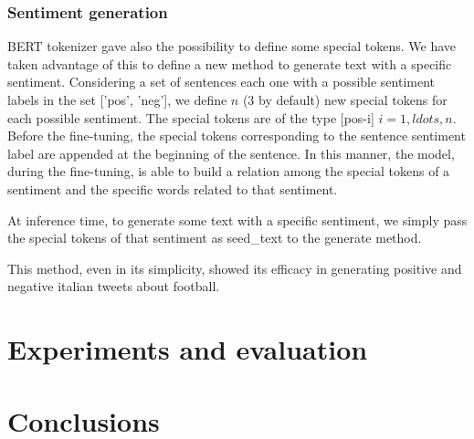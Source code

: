 \documentclass[10pt,twocolumn,letterpaper]{article}
\begin{document}
\subsubsection{Sentiment generation}
BERT tokenizer gave also the possibility to define some special tokens.
We have taken advantage of this to define a new method to generate text
with a specific sentiment.
Considering a set of sentences each one with a possible sentiment labels
in the set ['pos', 'neg'], we define $n$ (3 by default) new special tokens
for each possible sentiment.
The special tokens are of the type [pos-i] $i=1,ldots,n$.
Before the fine-tuning, the special tokens corresponding to the sentence
sentiment label are appended at the beginning of the sentence.
In this manner, the model, during the fine-tuning, is able to build a
relation among the special tokens of a sentiment and the specific words
related to that sentiment.

At inference time, to generate some text with a specific sentiment,
we simply pass the special tokens of that sentiment as seed\_text to the
generate method.

This method, even in its simplicity, showed its efficacy in generating positive
and negative italian tweets about football.

\section{Experiments and evaluation}

\section{Conclusions}



\end{document}
